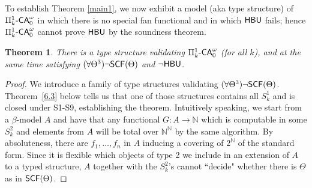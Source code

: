 \documentclass[reqno]{amsart}
\newtheorem{thm}{Theorem}
\def\SIXK{\Pi_{k}^{1}\text{-\textsf{\textup{CA}}}_{0}^{\omega}}
\def\({\textup{(}}
\def\){\textup{)}}
\def\N{{\mathbb  N}}
\def\HBU{\textup{\textsf{HBU}}}
\def\SCF{\textup{\textsf{SCF}}}
\numberwithin{equation}{section}
\numberwithin{thm}{section}
\begin{document}
To establish Theorem \ref{main1}, we now exhibit a model (aka type structure) of $\SIXK$ in which there is no special fan functional and in which $\HBU$ fails; hence $\SIXK$ cannot prove $\HBU$ by the soundness theorem. 
\begin{thm}\label{realmain1}
There is a type structure validating $\SIXK$ \(for all $k$\), and at the same time satisfying $(\forall \Theta^{3})\neg\SCF(\Theta)$ and $\neg\HBU$.  
\end{thm}
\begin{proof}
We introduce a family of type structures validating $(\forall \Theta^{3})\neg\SCF(\Theta)$.  Theorem~\ref{6.3} below tells us that one of those structures contains all $S_{k}^{1}$ and is closed under S1-S9, establishing the theorem. 
Intuitively speaking, we start from a $\beta$-model $A$ and have that any functional $G:A \rightarrow \N$ which is computable in some $S^2_k$ and elements from $A$ will be total over $\N^\N$ by the same algorithm.  
By absoluteness, there are $f_1 , \ldots , f_n$ in $A$ inducing a covering of $2^{\N}$ of the standard form. Since it is flexible which objects of type 2 we include in an extension of $A$ to a typed structure, $A$ together with the $S^2_k$'s cannot ``decide" whether there is $\Theta$ as in $\SCF(\Theta)$.

\smallskip


\end{proof}
\end{document}
